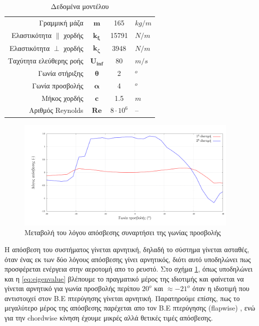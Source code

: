 \begin{table}[ht!]
    \begin{center}
        \begin{tabular}[c]{|r|c|c|l|}
            \hline
            Γραμμική μάζα & $\mathbf{m}$ & 165 & $kg/m$ \\
            Ελαστικότητα $\parallel$ χορδής & $\mathbf{k_{\xi}}$ & 15791 & $N/m$ \\
            Ελαστικότητα $\perp$ χορδής & $\mathbf{k_{\zeta}}$ & 3948 & $N/m$ \\
            Ταχύτητα ελεύθερης ροής & $\mathbf{U_{inf}}$ & 80 & $m/s$ \\
            Γωνία στήριξης & $\mathbf{\theta}$ & 2 & $^o$ \\
            Γωνία προσβολής & $\mathbf{\alpha}$ & 4 & $^o$ \\
            Μήκος χορδής & $\mathbf{c}$ & 1.5 & $m$ \\
            Αριθμός Reynolds & $\mathbf{Re}$ & $8\cdot 10^6$ & -- \\
            \hline
        \end{tabular}
    \caption{Δεδομένα μοντέλου}
    \label{tab:data}
    \end{center}
\end{table}

\begin{figure}
    \begin{center}
        \includegraphics[width=0.95\textwidth]{./figures/aoa_vs_damp.pdf}
    \end{center}
    \caption{Μεταβολή του λόγου απόσβεσης συναρτήσει της γωνίας προσβολής}
    \label{fig:damping}
\end{figure}

Η απόσβεση του συστήματος γίνεται αρνητική, δηλαδή το σύστημα γίνεται ασταθές, όταν ένας εκ των δύο λόγους απόσβεσης γίνει αρνητικός, διότι αυτό υποδηλώνει πως προσφέρεται ενέργεια στην αεροτομή απο το ρευστό. Στο σχήμα \ref{fig:damping}, όπως υποδηλώνει και η \cref{eq:eigenvalue} βλέπουμε το πραγματικό μέρος της ιδιοτιμής και φαίνεται να γίνεται αρνητικό για γωνία προσβολής περίπου $20^o$ και $\approx-21^o$ όταν η ιδιοτιμή που αντιστοιχεί στον Β.Ε πτερύγησης γίνεται αρνητική. Παρατηρούμε επίσης, πως το μεγαλύτερο μέρος της απόσβεσης παρέχεται απο τον Β.Ε πτερύγησης (flapwise) , ενώ για την chordwise κίνηση έχουμε μικρές αλλά θετικές τιμές απόσβεσης.

